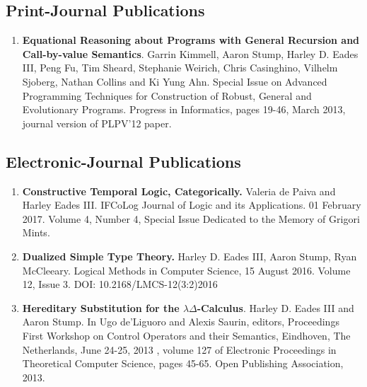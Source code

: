 \documentclass{article}
\begin{document}
  \subsection{Print-Journal Publications}
  \begin{enumerate}
  \item \textbf{Equational Reasoning about Programs with General Recursion and Call-by-value Semantics}.
  Garrin Kimmell, Aaron Stump, Harley D. Eades III, Peng Fu, Tim Sheard, Stephanie Weirich, 
  Chris Casinghino, Vilhelm Sjoberg, Nathan Collins and Ki Yung Ahn. 
  Special Issue on Advanced Programming Techniques for Construction of Robust, General and Evolutionary 
  Programs. Progress in Informatics, pages 19-46, March 2013, journal version of PLPV’12 paper. 
  \end{enumerate}

  \subsection{Electronic-Journal Publications}

  \begin{enumerate}
  \item \textbf{Constructive Temporal Logic, Categorically.} Valeria
    de Paiva and Harley Eades III.  IFCoLog Journal of Logic and its
    Applications. 01 February 2017. Volume 4, Number 4, Special Issue
    Dedicated to the Memory of Grigori Mints.

  \item \textbf{Dualized Simple Type Theory.} Harley D. Eades III, Aaron
    Stump, Ryan McCleeary. Logical Methods in Computer Science, 15
    August 2016. Volume 12, Issue 3. DOI: 10.2168/LMCS-12(3:2)2016

  \item \textbf{Hereditary Substitution for the
    $\lambda\Delta$-Calculus}.  Harley D. Eades III and Aaron Stump.
    In Ugo de'Liguoro and Alexis Saurin, editors, Proceedings First
    Workshop on Control Operators and their Semantics, Eindhoven, The
    Netherlands, June 24-25, 2013 , volume 127 of Electronic
    Proceedings in Theoretical Computer Science, pages 45-65. Open
    Publishing Association, 2013.

  \end{enumerate}
\end{document}
